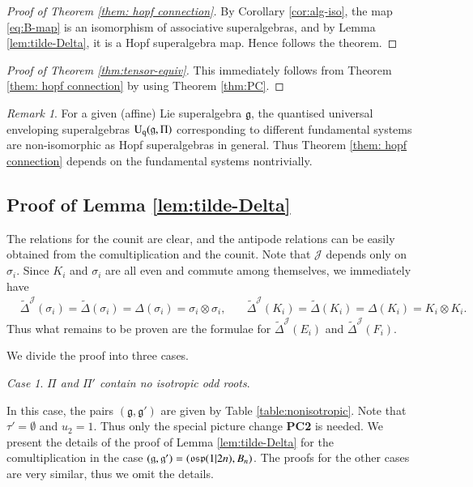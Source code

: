 \documentclass[12pt]{amsart}
\theoremstyle{definition}
\theoremstyle{remark}
\newtheorem{remark}[theorem]{Remark}
\numberwithin{equation}{section}
\newtheorem{case}{Case}
\begin{document}
\begin{proof}[Proof of Theorem \ref{them: hopf connection}]
By Corollary \ref{cor:alg-iso}, the map \eqref{eq:B-map}
is an isomorphism of associative superalgebras, and by Lemma \ref{lem:tilde-Delta}, it is a Hopf superalgebra map. Hence follows the theorem.
\end{proof}

\begin{proof}[Proof of Theorem \ref{thm:tensor-equiv}]
This immediately follows from Theorem \ref{them: hopf connection} by using 
Theorem \ref{thm:PC}. 
\end{proof}

\begin{remark} 
For a given (affine) Lie superalgebra ${{\mathfrak g}}$, 
the quantised universal enveloping superalgebras ${{\rm{U}_q}}({{\mathfrak g}}, \Pi)$  corresponding to different fundamental systems are non-isomorphic as Hopf superalgebras  in general. 
Thus Theorem \ref{them: hopf connection} depends on the fundamental systems nontrivially. 
\end{remark}

\subsection{Proof of Lemma \ref{lem:tilde-Delta}}\label{pf:key-lemma}

The relations for the counit are clear,
and the antipode relations can be easily obtained from the comultiplication
and the counit. Note that  ${{\mathcal J}}$ depends only on $\sigma_i$.
Since $K_i$ and $\sigma_i$ are all even and
commute among themselves, we immediately have
\[
\begin{aligned}
&\tilde{\Delta}^{{\mathcal J}}(\sigma_i)=\tilde{\Delta}(\sigma_i)=\Delta(\sigma_i)=\sigma_i\otimes\sigma_i, \quad
&\tilde{\Delta}^{{\mathcal J}}(K_i)=\tilde{\Delta}(K_i)=\Delta(K_i)=K_i\otimes K_i.
\end{aligned}
\]
Thus what remains to be proven are the formulae for $\tilde{\Delta}^{{\mathcal J}}(E_i)$
and $\tilde{\Delta}^{{\mathcal J}}(F_i)$.

We  divide the proof into three cases.

\begin{case}
{\em $\Pi$ and $\Pi'$ contain no isotropic odd roots}.
\end{case}
In this case, the  pairs $({{\mathfrak g}}, {{\mathfrak g}}')$ are given by Table \ref{table:nonisotropic}.
Note that $\tau'=\emptyset$ and $u_2=1$. Thus only the special picture change {\bf PC2}  is needed.
We present the details of the proof of Lemma \ref{lem:tilde-Delta} for the comultiplication in the case $({{\mathfrak g}},{{\mathfrak g}}')=({{\rm\mathfrak{osp}}}(1|2n),B_n)$. The proofs for the other cases are very similar, thus we omit the details.
\end{document}

